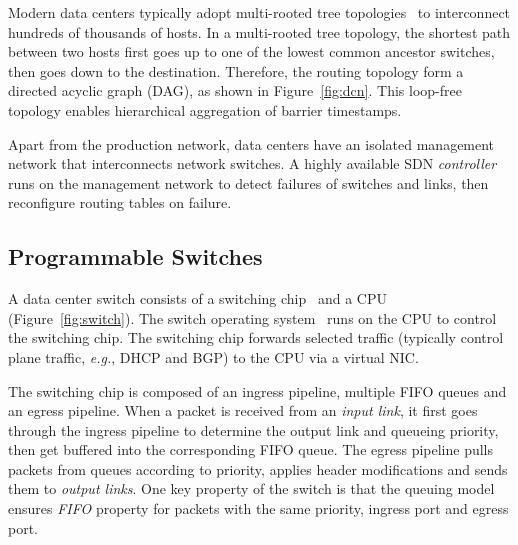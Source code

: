 Modern data centers typically adopt multi-rooted tree topologies~\cite{leiserson1985fat,greenberg2009vl2} to interconnect hundreds of thousands of hosts. In a multi-rooted tree topology, the shortest path between two hosts first goes up to one of the lowest common ancestor switches, then goes down to the destination.
Therefore, the routing topology form a directed acyclic graph (DAG), as shown in Figure~\ref{fig:dcn}.
This loop-free topology enables hierarchical aggregation of barrier timestamps.

Apart from the production network, data centers have an isolated management network that interconnects network switches.
A highly available SDN \emph{controller} runs on the management network to detect failures of switches and links, then reconfigure routing tables on failure.


\subsection{Programmable Switches}
\label{sec:programmable-switches}

A data center switch consists of a switching chip~\cite{broadcom,tofino} and a CPU (Figure~\ref{fig:switch}). The switch operating system~\cite{arista-eos} runs on the CPU to control the switching chip. %
The switching chip forwards selected traffic (typically control plane traffic, \textit{e.g.}, DHCP and BGP) to the CPU via a virtual NIC.

The switching chip is composed of an ingress pipeline, multiple FIFO queues and an egress pipeline.
When a packet is received from an \textit{input link}, it first goes through the ingress pipeline to determine the output link and queueing priority, then get buffered into the corresponding FIFO queue.
The egress pipeline pulls packets from queues according to priority, applies header modifications and sends them to \textit{output links}.
One key property of the switch is that the queuing model ensures \emph{FIFO} property for packets with the same priority, ingress port and egress port. %

